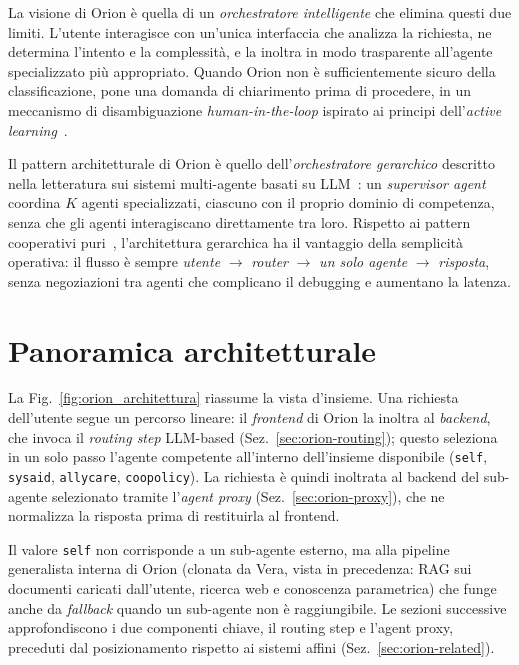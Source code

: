 La visione di Orion è quella di un \emph{orchestratore intelligente} che elimina questi due limiti.
L'utente interagisce con un'unica interfaccia che analizza la richiesta, ne determina l'intento e la complessità,
e la inoltra in modo trasparente all'agente specializzato più appropriato.
Quando Orion non è sufficientemente sicuro della classificazione, pone una domanda di chiarimento prima di procedere,
in un meccanismo di disambiguazione \emph{human-in-the-loop} ispirato ai principi dell'\emph{active learning}~\cite{settles2012active,diao2023activeprompting}.

Il pattern architetturale di Orion è quello dell'\emph{orchestratore gerarchico} descritto nella letteratura sui sistemi multi-agente basati su
LLM~\cite{guo2024multiagent}: un \emph{supervisor agent} coordina $K$ agenti specializzati,
ciascuno con il proprio dominio di competenza, senza che gli agenti interagiscano direttamente tra loro.
Rispetto ai pattern cooperativi puri~\cite{wu2023autogen,wang2024moa}, l'architettura gerarchica ha il vantaggio
della semplicità operativa: il flusso è sempre \emph{utente} $\rightarrow$ \emph{router} $\rightarrow$ \emph{un solo agente} $\rightarrow$ \emph{risposta},
senza negoziazioni tra agenti che complicano il debugging e aumentano la latenza.

\section{Panoramica architetturale}
\label{sec:orion-panoramica}
\label{sec:orion-impl-multirepo}

La Fig.~\ref{fig:orion_architettura} riassume la vista d'insieme.
Una richiesta dell'utente segue un percorso lineare: il \emph{frontend} di Orion
la inoltra al \emph{backend}, che invoca il \emph{routing step} LLM-based (Sez.~\ref{sec:orion-routing});
questo seleziona in un solo passo l'agente competente all'interno dell'insieme disponibile (\texttt{self}, \texttt{sysaid}, \texttt{allycare}, \texttt{coopolicy}).
La richiesta è quindi inoltrata al backend del sub-agente selezionato tramite l'\emph{agent proxy} (Sez.~\ref{sec:orion-proxy}),
che ne normalizza la risposta prima di restituirla al frontend.

Il valore \texttt{self} non corrisponde a un sub-agente esterno,
ma alla pipeline generalista interna di Orion (clonata da Vera, vista in precedenza: RAG sui documenti caricati dall'utente, ricerca web e conoscenza parametrica)
che funge anche da \emph{fallback} quando un sub-agente non è raggiungibile.
Le sezioni successive approfondiscono i due componenti chiave, il routing step e l'agent proxy,
preceduti dal posizionamento rispetto ai sistemi affini (Sez.~\ref{sec:orion-related}).

